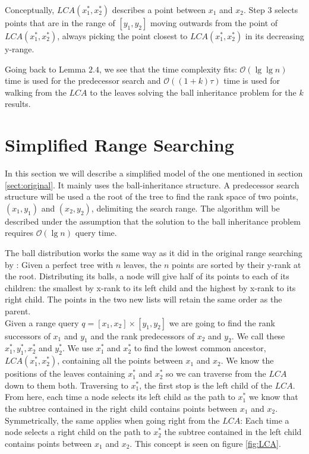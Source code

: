 Conceptually, $LCA(x^*_1, x^*_2)$ describes a point between $x_1$ and $x_2$. Step $3$ selects points that are in the range of $[y_1, y_2]$ moving outwards from the point of $LCA(x^*_1, x^*_2)$, always picking the point closest to $LCA(x^*_1, x^*_2)$ in its decreasing y-range. 

Going back to Lemma $2.4$, we see that the time complexity fits: $\mathcal{O}(\lg \lg n)$ time is used for the predecessor search and $\mathcal{O}((1+k)\tau)$ time is used for walking from the $LCA$ to the leaves solving the ball inheritance problem for the $k$ results.

\section{Simplified Range Searching}

In this section we will describe a simplified model of the one mentioned in section \ref{sect:original}. It mainly uses the ball-inheritance structure. A predecessor search structure will be used a the root of the tree to find the rank space of two points, $(x_1,y_1)$ and $(x_2,y_2)$, delimiting the search range. The algorithm will be described under the assumption that the solution to the ball inheritance problem requires $\mathcal{O}(\lg n)$ query time.

The ball distribution works the same way as it did in the original range searching by \citeauthor{chanetal}: Given a perfect tree with $n$ leaves, the $n$ points are sorted by their y-rank at the root. Distributing its balls, a node will give half of its points to each of its children: the smallest by x-rank to its left child and the highest by x-rank to its right child. The points in the two new lists will retain the same order as the parent. \\

Given a range query $q = [x_1, x_2] \times [y_1, y_2]$ we are going to find the rank successors of $x_1$ and $y_1$ and the rank predecessors of $x_2$ and $y_2$.  We call these $x^*_1, y^*_1, x^*_2$ and $y^*_2$. We use $x^*_1$ and $x^*_2$ to find the lowest common ancestor, $LCA(x^*_1, x^*_2)$, containing all the points between $x_1$ and $x_2$. We know the positions of the leaves containing $x^*_1$ and $x^*_2$ so we can traverse from the $LCA$ down to them both. Traversing to $x^*_1$, the first stop is the left child of the $LCA$. From here, each time a node selects its left child as the path to $x^*_1$ we know that the subtree contained in the right child contains points between $x_1$ and $x_2$. Symmetrically, the same applies when going right from the $LCA$: Each time a node selects a right child on the path to $x^*_2$ the subtree contained in the left child contains points between $x_1$ and $x_2$. This concept is seen on figure \ref{fig:LCA}. \\

